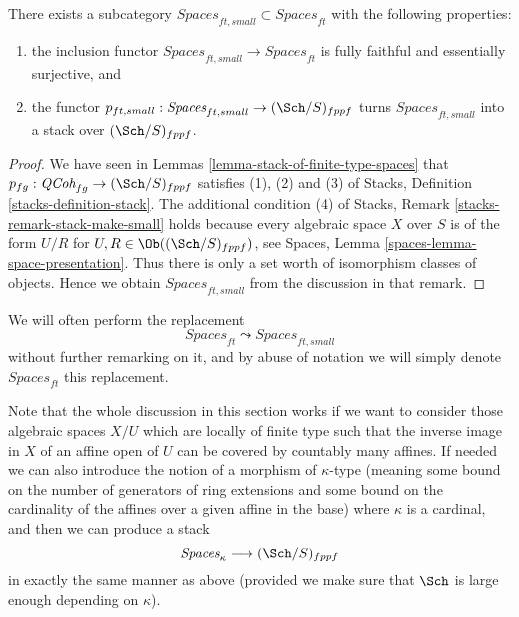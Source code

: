 \begin{lemma}
\label{lemma-stack-ft-spaces}
There exists a subcategory
$\textit{Spaces}_{ft, small} \subset \textit{Spaces}_{ft}$
with the following properties:
\begin{enumerate}
\item the inclusion functor
$\textit{Spaces}_{ft, small} \to \textit{Spaces}_{ft}$ is
fully faithful and essentially surjective, and
\item the functor
$p_{ft, small} : \textit{Spaces}_{ft, small} \to (\Sch/S)_{fppf}$
turns $\textit{Spaces}_{ft, small}$ into a stack over
$(\Sch/S)_{fppf}$.
\end{enumerate}
\end{lemma}

\begin{proof}
We have seen in
Lemmas \ref{lemma-stack-of-finite-type-spaces}
that $p_{fg} : \textit{QCoh}_{fg} \to (\Sch/S)_{fppf}$
satisfies (1), (2) and (3) of
Stacks, Definition \ref{stacks-definition-stack}.
The additional condition (4) of
Stacks, Remark \ref{stacks-remark-stack-make-small}
holds because every algebraic space $X$ over $S$ is of the
form $U/R$ for $U, R \in \Ob((\Sch/S)_{fppf})$, see
Spaces, Lemma \ref{spaces-lemma-space-presentation}.
Thus there is only a set worth of isomorphism classes of objects.
Hence we obtain $\textit{Spaces}_{ft, small}$ from the discussion
in that remark.
\end{proof}

\noindent
We will often perform the replacement
$$
\textit{Spaces}_{ft} \leadsto \textit{Spaces}_{ft, small}
$$
without further remarking on it, and by abuse of notation we will
simply denote $\textit{Spaces}_{ft}$ this replacement.

\begin{remark}
\label{remark-higher-cardinality-spaces}
Note that the whole discussion in this section works
if we want to consider those algebraic spaces $X/U$ which are
locally of finite type such that the inverse image in $X$ of an affine open
of $U$ can be covered by countably many affines.
If needed we can also introduce the notion of a morphism of
$\kappa$-type (meaning some bound on the number of generators of
ring extensions and some bound on the cardinality of the affines over
a given affine in the base) where $\kappa$ is a cardinal, and then
we can produce a stack
$$
\textit{Spaces}_\kappa \longrightarrow (\Sch/S)_{fppf}
$$
in exactly the same manner as above (provided we make sure that
$\Sch$ is large enough depending on $\kappa$).
\end{remark}






